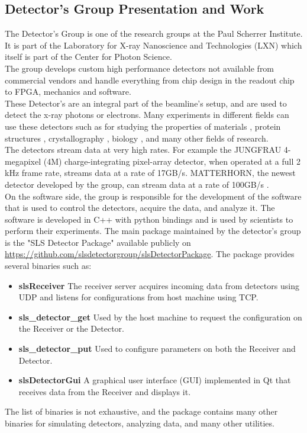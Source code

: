 \begin{spacing}{1.2}
    \section{Detector's Group Presentation and Work}
    The Detector's Group is one of the research groups at the Paul Scherrer Institute. It is part of the Laboratory for X-ray Nanoscience and Technologies (LXN) which itself
    is part of the Center for Photon Science.\\

    The group develops custom high performance detectors not available from commercial vendors and handle everything
    from chip design in the readout chip to FPGA, mechanics and software.\\

    These Detector's are an integral part of the beamline's setup, and are used to detect the x-ray photons or electrons. Many experiments in different
    fields can use these detectors such as for studying the properties of
    materials \cite{butcher2024ptychographic},
    protein structures \cite{pomeranz2009crystal}, crystallography \cite{leonarski2023kilohertz}, biology \cite{lemcoff2023brilliant,dullin2024vivo}, and many other fields of research.\\


    The detectors stream data at very high rates. For example the JUNGFRAU 4-megapixel (4M)
    charge-integrating pixel-array detector, when operated at a full 2 kHz frame rate,
    streams data at a rate of 17GB/s. MATTERHORN, the newest detector developed by the group,
    can stream data at a rate of 100GB/s \cite{matterhorn, Jungfraujoch}.\\

    On the software side, the group is responsible for the development of the software that is used to control the detectors, acquire the data, and analyze it.
    The software is developed in C++ with python bindings and is used by scientists to perform their experiments.
    The main package maintained by the detector's group is the "SLS Detector Package" available publicly
    on \url{https://github.com/slsdetectorgroup/slsDetectorPackage}. The package provides several binaries such as:
    \begin{itemize}
        \item \textbf{slsReceiver} The receiver server acquires incoming data from detectors using UDP and listens for configurations from host machine using TCP.
        \item \textbf{sls\_detector\_get} Used by the host machine to request the configuration on the Receiver or the Detector.
        \item \textbf{sls\_detector\_put} Used to configure parameters on both the Receiver and Detector.
        \item \textbf{slsDetectorGui} A graphical user interface (GUI) implemented in Qt that receives data from the Receiver and displays it.
    \end{itemize}
    The list of binaries is not exhaustive, and the package contains many other binaries for simulating detectors, analyzing data, and many other utilities.


\end{spacing}
